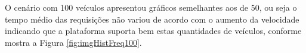 \documentclass[
	12pt,				%
	oneside,			%
	a4paper,			%
	english,			%
	brazil				%
	]{abntex2ppgsi}
\begin{document}
\begin{figure}[h!]
{		\label{fig:imgGraficoFreq4g50}
	}	
\end{figure}


O cenário com 100 veículos apresentou gráficos semelhantes aos de 50, ou seja o tempo médio das requisições não variou de acordo com o aumento da velocidade indicando que a plataforma suporta bem estas quantidades de veículos, conforme mostra a Figura \ref{fig:imgHistFreq100}.
\end{document}
